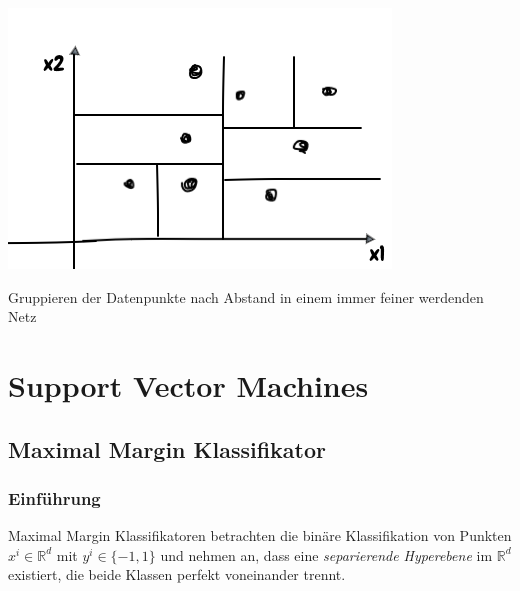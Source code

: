 \documentclass{report}
\begin{document}
  \begin{center}	
    \includegraphics[scale=.375]{ml05_7}	
  \end{center}	
  
  Gruppieren der Datenpunkte nach Abstand in einem immer feiner werdenden Netz	
  
  \chapter{Support Vector Machines}	
  \section{Maximal Margin Klassifikator}	
  \subsection{Einführung}	
  
  Maximal Margin Klassifikatoren betrachten die binäre Klassifikation von Punkten $x^i \in \mathbb{R}^d$ mit	
  $y^i \in \{-1, 1\}$ und nehmen an, dass eine \textit{separierende Hyperebene} im $\mathbb{R}^d$ existiert,	
  die beide Klassen perfekt voneinander trennt.	
  
\end{document}
